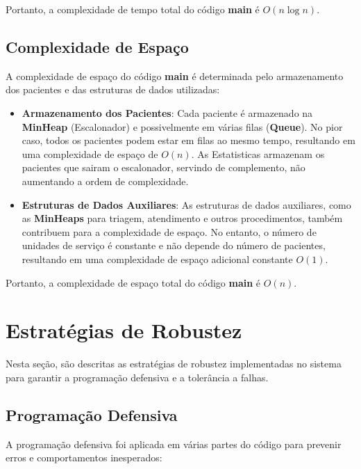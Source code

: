 \documentclass[a4paper,12pt]{article}
\begin{document}
Portanto, a complexidade de tempo total do código \textbf{main} é $O(n \log n)$.

\subsection{Complexidade de Espaço}
A complexidade de espaço do código \textbf{main} é determinada pelo armazenamento dos pacientes e das estruturas de dados utilizadas:

\begin{itemize}
    \item \textbf{Armazenamento dos Pacientes}: Cada paciente é armazenado na \textbf{MinHeap} (Escalonador) e possivelmente em várias filas (\textbf{Queue}). 
    No pior caso, todos os pacientes podem estar em filas ao mesmo tempo, resultando em uma complexidade de espaço de $O(n)$. 
    As Estatisticas armazenam os pacientes que sairam o escalonador, servindo de complemento, não aumentando a ordem de complexidade.
    \item \textbf{Estruturas de Dados Auxiliares}: As estruturas de dados auxiliares, como as \textbf{MinHeaps} para triagem, 
    atendimento e outros procedimentos, também contribuem para a complexidade de espaço. No entanto, 
    o número de unidades de serviço é constante e não depende do número de pacientes, resultando em uma complexidade de espaço adicional constante $O(1)$.
\end{itemize}

Portanto, a complexidade de espaço total do código \textbf{main} é $O(n)$.

\section{Estratégias de Robustez}
\hspace*{1cm}
Nesta seção, são descritas as estratégias de robustez implementadas no sistema para garantir a programação defensiva e a tolerância a falhas.

\subsection{Programação Defensiva}
A programação defensiva foi aplicada em várias partes do código para prevenir erros e comportamentos inesperados:
\end{document}
